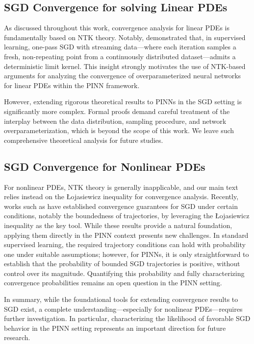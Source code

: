 \documentclass{article}
\begin{document}
\subsection{SGD Convergence for solving Linear PDEs}\label{sec:sgd linear}

As discussed throughout this work, convergence analysis for linear PDEs is fundamentally based on NTK theory. 
Notably, \cite{xu2024overparametrized} demonstrated that, in supervised learning, one-pass SGD with streaming data---where each iteration samples a fresh, non-repeating point from a continuously distributed dataset---admits a deterministic limit kernel. 
This insight strongly motivates the use of NTK-based arguments for analyzing the convergence of overparameterized neural networks for linear PDEs within the PINN framework.

However, extending rigorous theoretical results to PINNs in the SGD setting is significantly more complex. 
Formal proofs demand careful treatment of the interplay between the data distribution, sampling procedure, and network overparameterization, which is beyond the scope of this work. 
We leave such comprehensive theoretical analysis for future studies.

\subsection{SGD Convergence for Nonlinear PDEs}\label{sec:sgd nonlinear}

For nonlinear PDEs, NTK theory is generally inapplicable, and our main text relies instead on the Łojasiewicz inequality for convergence analysis. 
Recently, works such as \cite{dereich2021convergence, an2023convergence} have established convergence guarantees for SGD under certain conditions, notably the boundedness of trajectories, by leveraging the Łojasiewicz inequality as the key tool.
While these results provide a natural foundation, applying them directly in the PINN context presents new challenges. 
In standard supervised learning, the required trajectory conditions can hold with probability one under suitable assumptions; however, for PINNs, it is only straightforward to establish that the probability of bounded SGD trajectories is positive, without control over its magnitude. 
Quantifying this probability and fully characterizing convergence probabilities remains an open question in the PINN setting.

In summary, while the foundational tools for extending convergence results to SGD exist, a complete understanding—especially for nonlinear PDEs—requires further investigation. In particular, characterizing the likelihood of favorable SGD behavior in the PINN setting represents an important direction for future research.
\end{document}
